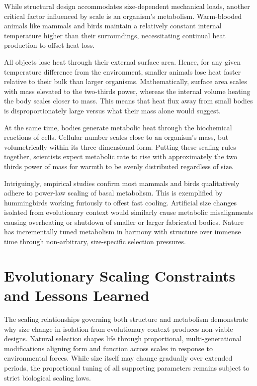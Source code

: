While structural design accommodates size-dependent mechanical loads, another critical factor influenced by scale is an organism's metabolism. Warm-blooded animals like mammals and birds maintain a relatively constant internal temperature higher than their surroundings, necessitating continual heat production to offset heat loss. 

All objects lose heat through their external surface area. Hence, for any given temperature difference from the environment, smaller animals lose heat faster relative to their bulk than larger organisms. Mathematically, surface area scales with mass elevated to the two-thirds power, whereas the internal volume heating the body scales closer to mass. This means that heat flux away from small bodies is disproportionately large versus what their mass alone would suggest.

At the same time, bodies generate metabolic heat through the biochemical reactions of cells. Cellular number scales close to an organism's mass, but volumetrically within its three-dimensional form. Putting these scaling rules together, scientists expect metabolic rate to rise with approximately the two thirds power of mass for warmth to be evenly distributed regardless of size.

Intriguingly, empirical studies confirm most mammals and birds qualitatively adhere to power-law scaling of basal metabolism. This is exemplified by hummingbirds working furiously to offest fast cooling. Artificial size changes isolated from evolutionary context would similarly cause metabolic misalignments causing overheating or shutdown of smaller or larger fabricated bodies. Nature has incrementally tuned metabolism in harmony with structure over immense time through non-arbitrary, size-specific selection pressures.

\section{Evolutionary Scaling Constraints and Lessons Learned}

The scaling relationships governing both structure and metabolism demonstrate why size change in isolation from evolutionary context produces non-viable designs. Natural selection shapes life through proportional, multi-generational modifications aligning form and function across scales in response to environmental forces. While size itself may change gradually over extended periods, the proportional tuning of all supporting parameters remains subject to strict biological scaling laws.

